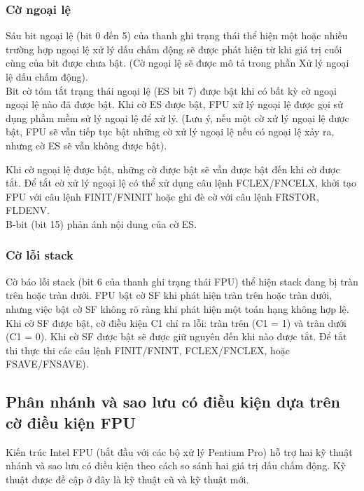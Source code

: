 		\subsubsection*{ Cờ ngoại lệ}
	Sáu bit ngoại lệ (bit 0 đến 5) của thanh ghi trạng thái thể hiện một hoặc nhiều trường hợp ngoại lệ xử lý dấu chấm động sẽ được phát hiện từ khi giá trị cuối cùng của bit được chưa bật. (Cờ ngoại lệ sẽ được mô tả trong phần Xử lý ngoại lệ dấu chấm động). \\

	Bit cờ tóm tắt trạng thái ngoại lệ (ES bit 7) được bật khi có bất kỳ cờ ngoại ngoại lệ nào đã được bật. Khi cờ ES được bật, FPU xử lý ngoại lệ được gọi sử dụng phầm mềm sử lý ngoại lệ để xử lý. (Lưu ý, nếu một cờ xử lý ngoại lệ được bật, FPU sẽ vẫn tiếp tục bật những cờ xử lý ngoại lệ nếu có ngoại lệ xảy ra, nhưng cờ ES sẽ vẫn không được bật). 
	
	Khi cờ ngoại lệ được bật, những cờ được bật sẽ vẫn được bật đến khi cờ được tắt. Để tắt cờ xử lý ngoại lệ có thể xử dụng câu lệnh FCLEX/FNCELX, khởi tạo FPU với câu lệnh FINIT/FNINIT hoặc ghi đè cờ với câu lệnh FRSTOR, FLDENV. \\
		
		B-bit (bit 15) phản ánh nội dung của cờ ES. 
				
		\subsubsection*{ Cờ lỗi stack}
	Cờ báo lỗi stack (bit 6 của thanh ghi trạng thái FPU) thể hiện stack đang bị tràn trên hoặc tràn dưới. FPU bật cờ SF khi phát hiện tràn trên hoặc tràn dưới, nhưng việc bật cờ SF không rõ ràng khi phát hiện một toán hạng không hợp lệ. Khi cờ SF được bật,  cờ điều kiện C1 chỉ ra lỗi: tràn trên (C1 = 1) và tràn dưới (C1 = 0). Khi cờ SF được bật sẽ được giữ nguyên đến khi nào được tắt. Để tắt thi thực thi các câu lệnh FINIT/FNINT, FCLEX/FNCLEX, hoặc FSAVE/FNSAVE).

		\subsection*{ Phân nhánh và sao lưu có điều kiện dựa trên cờ điều kiện FPU}
	Kiến trúc Intel FPU (bắt đầu với các bộ xử lý Pentium Pro) hỗ trợ hai kỹ thuật nhánh và sao lưu có điều kiện theo cách so sánh hai giá trị dấu chấm động. Kỹ thuật được đề cập ở đây là kỹ thuật cũ và kỹ thuật mới.\\
	

